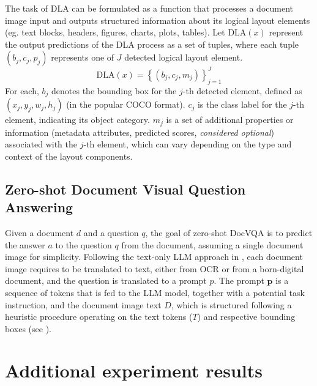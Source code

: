 The task of DLA can be formulated as a function that processes a document image input and outputs structured information about its logical layout elements (eg. text blocks, headers, figures, charts, plots, tables).
Let  $\mathrm{DLA}(x)$ represent the output predictions of the DLA process as a set of tuples, where each tuple $\left(b_j, c_j, p_j\right)$ represents one of $J$ detected logical layout element.
\begin{equation}
  \mathrm{DLA}(x)=\left\{\left(b_j, c_j, m_j\right)\right\}_{j=1}^J
\end{equation}
For each, $b_j$ denotes the bounding box for the $j$-th detected element, defined as $\left(x_j, y_j, w_j, h_j\right)$ (in the popular COCO format).
$c_j$ is the class label for the $j$-th element, indicating its object category. $m_j$ is a set of additional properties or information (metadata attributes, predicted scores, \textit{considered optional}) associated with the $j$-th element, which can vary depending on the type and context of the layout components.


\subsection{Zero-shot Document Visual Question Answering}\label{sec:supp-taskdef_docvqa}

Given a document $d$ and a question $q$, the goal of zero-shot DocVQA is to predict the answer $a$ to the question $q$ from the document, assuming a single document image for simplicity.
Following the text-only LLM approach in \cite{wang2023layout}, each document image requires to be translated to text, either from OCR or from a born-digital document, and the question is translated to a prompt $p$. The prompt $\boldsymbol{p}$ is a sequence of tokens that is fed to the LLM model, together with a potential task instruction, and the document image text $D$, which is structured following a heuristic procedure operating on the text tokens ($T$) and respective bounding boxes (see ).

\section{Additional experiment results}\label{sec:supp-results}

